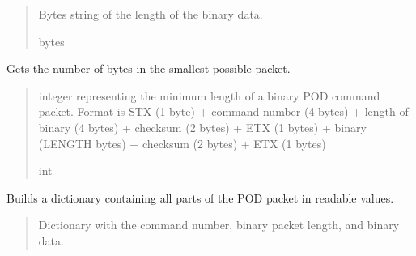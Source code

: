 \documentclass[letterpaper,10pt,english]{sphinxmanual}
\begin{document}
\begin{fulllineitems}
\begin{fulllineitems}
\begin{quote}
\begin{description}
\sphinxAtStartPar
Bytes string of the length of the binary data.

\sphinxAtStartPar
bytes

\end{description}\end{quote}

\end{fulllineitems}


\begin{fulllineitems}
\label{\detokenize{Morelia.Packets:Morelia.Packets.Binary.PacketBinary.GetMinimumLength}}
\pysigstartsignatures
{}
\pysigstopsignatures
\sphinxAtStartPar
Gets the number of bytes in the smallest possible packet.
\begin{quote}\begin{description}
\sphinxAtStartPar
integer representing the minimum length of a binary POD                 command packet. Format is STX (1 byte) + command number (4 bytes) + length                 of binary (4 bytes) + checksum (2 bytes) + ETX (1 bytes) + binary (LENGTH                 bytes) + checksum (2 bytes) + ETX (1 bytes)

\sphinxAtStartPar
int

\end{description}\end{quote}

\end{fulllineitems}


\begin{fulllineitems}
\label{\detokenize{Morelia.Packets:Morelia.Packets.Binary.PacketBinary.TranslateAll}}
\pysigstartsignatures
{}
\pysigstopsignatures
\sphinxAtStartPar
Builds a dictionary containing all parts of the POD packet in readable values.
\begin{quote}\begin{description}
\sphinxAtStartPar
Dictionary with the command number, binary packet length,                 and binary data.


\end{description}
\end{quote}
\end{fulllineitems}
\end{fulllineitems}
\end{document}
